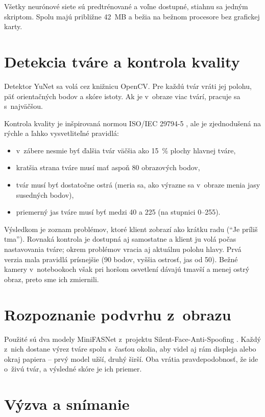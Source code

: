 \documentclass[12pt,a4paper,oneside]{report}
\begin{document}
Všetky neurónové siete sú predtrénované a voľne dostupné, stiahnu sa jedným skriptom.
Spolu majú približne 42~MB a bežia na bežnom procesore bez grafickej karty.

\section{Detekcia tváre a kontrola kvality}

Detektor YuNet sa volá cez knižnicu OpenCV. Pre každú tvár vráti jej polohu, päť
orientačných bodov a skóre istoty. Ak je v~obraze viac tvárí, pracuje sa s~najväčšou.

Kontrola kvality je inšpirovaná normou ISO/IEC 29794-5 \cite{iso29794-5}, ale je
zjednodušená na rýchle a ľahko vysvetliteľné pravidlá:
\begin{itemize}
  \item v~zábere nesmie byť ďalšia tvár väčšia ako 15~\% plochy hlavnej tváre,
  \item kratšia strana tváre musí mať aspoň 80 obrazových bodov,
  \item tvár musí byť dostatočne ostrá (meria sa, ako výrazne sa v~obraze menia jasy
        susedných bodov),
  \item priemerný jas tváre musí byť medzi 40 a 225 (na stupnici 0--255).
\end{itemize}
Výsledkom je zoznam problémov, ktoré klient zobrazí ako krátku radu (\enquote{Je príliš
tma}). Rovnaká kontrola je dostupná aj samostatne a klient ju volá počas nastavovania
tváre; okrem problémov vracia aj aktuálnu polohu hlavy. Prvá verzia mala pravidlá
prísnejšie (90 bodov, vyššia ostrosť, jas od 50). Bežné kamery v~notebookoch však pri
horšom osvetlení dávajú tmavší a menej ostrý obraz, preto sme ich zmiernili.

\section{Rozpoznanie podvrhu z~obrazu}

Použité sú dva modely MiniFASNet z~projektu Silent-Face-Anti-Spoofing
\cite{minivision2020silentface}. Každý z~nich dostane výrez tváre spolu s~časťou okolia,
aby videl aj rám displeja alebo okraj papiera -- prvý model užší, druhý širší. Oba
vrátia pravdepodobnosť, že ide o~živú tvár, a výsledné skóre je ich priemer.

\section{Výzva a snímanie}
\end{document}
